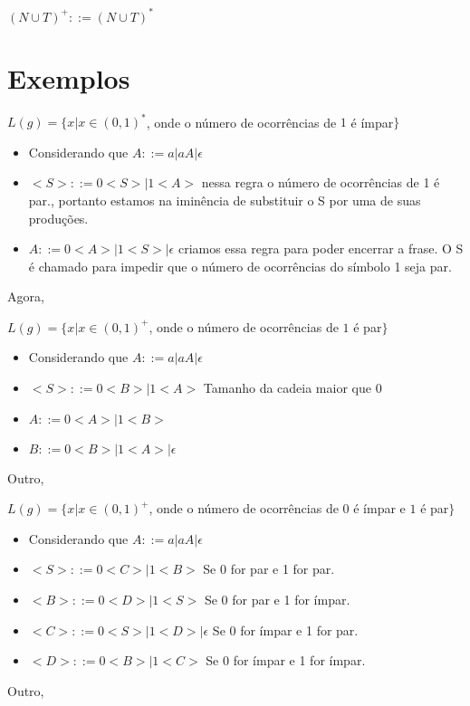 \documentclass[]{article}
\begin{document}
		$(N\cup T)^+ ::= (N\cup T)^*$
	\section{Exemplos}
		$L(g) = \{ x | x \in (0,1)^*$, onde o número de ocorrências de $1$ é ímpar$\}$
		\begin{itemize}
		
			
			
			\item Considerando que $A::= a|aA|\epsilon$
			
			
			\item $<S>::= 0<S> | 1<A>$ nessa regra o número de ocorrências de 1 é par., portanto estamos na iminência de substituir o  S por uma de suas produções.
		
			\item $A::= 0<A>|1<S>|\epsilon$ criamos essa regra para poder encerrar a frase. O S é chamado para impedir que o número de ocorrências do símbolo 1 seja par.
		\end{itemize}
		
		Agora,
		
		$L(g) = \{ x | x \in (0,1)^{+}$, onde o número de ocorrências de $1$ é par$\}$
		\begin{itemize}
		
			
			\item Considerando que $A::= a|aA|\epsilon$
			
			
			\item $<S>::= 0<B> | 1<A>$ Tamanho da cadeia maior que 0
		
			\item $A::= 0<A>|1<B>$ 
			
			\item $B ::= 0 <B>| 1<A>| \epsilon$
		\end{itemize}
		
		Outro,
		
		$L(g) = \{ x | x \in (0,1)^{+}$, onde o número de ocorrências de $0$ é ímpar e $1$ é par$\}$
		\begin{itemize}
			\item Considerando que $A::= a | aA | \epsilon$
			
			
			\item $<S> ::= 0<C>|1<B>$ Se 0 for par e 1 for par.
			\item $<B> ::= 0 <D> | 1<S>$ Se 0 for par e 1 for ímpar.
			\item $<C> ::= 0 <S> | 1<D> | \epsilon$ Se 0 for ímpar e 1 for par.
			\item $<D> ::= 0 <B> | 1<C>$ Se 0 for ímpar e 1 for ímpar.
			
		\end{itemize}
		\newpage
		Outro,
		
\end{document}
